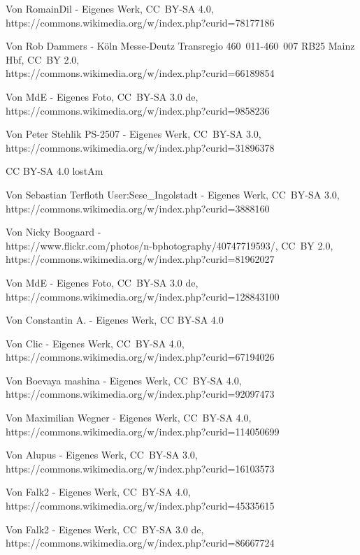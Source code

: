 \item[Desiro HC] Von RomainDil - Eigenes Werk, CC~BY-SA 4.0,\\
  https://commons.wikimedia.org/w/index.php?curid=78177186
\item[Desiro ML] Von Rob Dammers - Köln Messe-Deutz Transregio 460~011-460~007 RB25 Mainz Hbf, CC~BY 2.0,\\
  https://commons.wikimedia.org/w/index.php?curid=66189854
\item[ET0423] Von MdE - Eigenes Foto, CC~BY-SA 3.0 de,\\
   https://commons.wikimedia.org/w/index.php?curid=9858236
\item[ET0430] Von Peter Stehlik PS-2507 - Eigenes Werk, CC~BY-SA 3.0,\\
   https://commons.wikimedia.org/w/index.php?curid=31896378
\item[FLIRT 3XL] CC BY-SA 4.0 lostAm
\item[ICE 2] Von Sebastian Terfloth User:Sese\_Ingolstadt - Eigenes Werk, CC~BY-SA 3.0,\\
  https://commons.wikimedia.org/w/index.php?curid=3888160
\item[ICE 3MS] Von Nicky Boogaard -\\
  https://www.flickr.com/photos/n-bphotography/40747719593/, CC~BY 2.0,\\
  https://commons.wikimedia.org/w/index.php?curid=81962027
\item[iLINT 54] Von MdE - Eigenes Foto, CC~BY-SA 3.0 de,\\
  https://commons.wikimedia.org/w/index.php?curid=128843100
\item[Integral] Von Constantin A. - Eigenes Werk, CC BY-SA 4.0
\item[KISS 160] Von Clic - Eigenes Werk, CC~BY-SA 4.0,\\
   https://commons.wikimedia.org/w/index.php?curid=67194026
\item[KISS 200] Von Boevaya mashina - Eigenes Werk, CC~BY-SA 4.0,\\
   https://commons.wikimedia.org/w/index.php?curid=92097473
\item[Mireo] Von Maximilian Wegner - Eigenes Werk, CC~BY-SA 4.0,
  https://commons.wikimedia.org/w/index.php?curid=114050699
\item[RegioSprinter] Von Alupus - Eigenes Werk, CC~BY-SA 3.0,\\
  https://commons.wikimedia.org/w/index.php?curid=16103573
\item[TALENT 2] Von Falk2 - Eigenes Werk, CC~BY-SA 4.0,\\
  https://commons.wikimedia.org/w/index.php?curid=45335615
\item[TwinDexx Vario] Von Falk2 - Eigenes Werk, CC~BY-SA 3.0 de,\\
   https://commons.wikimedia.org/w/index.php?curid=86667724
